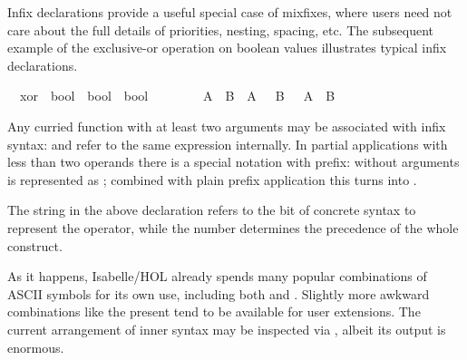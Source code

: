 \begin{isabellebody}
\begin{isamarkuptext}
  Infix declarations provide a useful
  special case of mixfixes, where users need not care about the full
  details of priorities, nesting, spacing, etc.  The subsequent
  example of the exclusive-or operation on boolean values illustrates
  typical infix declarations.%
\end{isamarkuptext}%
\isamarkuptrue%
\isanewline
\ \ xor\ {\isacharcolon}{\isacharcolon}\ {\isachardoublequote}bool\ {\isasymRightarrow}\ bool\ {\isasymRightarrow}\ bool{\isachardoublequote}\ \ \ \ {\isacharparenleft}\ {\isachardoublequote}{\isacharbrackleft}{\isacharplus}{\isacharbrackright}{\isachardoublequote}\ {}{}{\isacharparenright}\isanewline
\ \ {\isachardoublequote}A\ {\isacharbrackleft}{\isacharplus}{\isacharbrackright}\ B\ {\isasymequiv}\ {\isacharparenleft}A\ {\isasymand}\ {\isasymnot}\ B{\isacharparenright}\ {\isasymor}\ {\isacharparenleft}{\isasymnot}\ A\ {\isasymand}\ B{\isacharparenright}{\isachardoublequote}\isamarkupfalse%
%
\begin{isamarkuptext}%
Any curried function with at least two arguments may be associated
  with infix syntax:  and  refer to
  the same expression internally.  In partial applications with less
  than two operands there is a special notation with  prefix:
   without arguments is represented as ;
  combined with plain prefix application this turns 
  into .

  \medskip The string \isa{{\isachardoublequote}{\isacharbrackleft}{\isacharplus}{\isacharbrackright}{\isachardoublequote}} in the above declaration
  refers to the bit of concrete syntax to represent the operator,
  while the number  determines the precedence of the whole
  construct.

  As it happens, Isabelle/HOL already spends many popular combinations
  of ASCII symbols for its own use, including both \isa{{\isacharplus}} and
  \isa{{\isacharplus}{\isacharplus}}.  Slightly more awkward combinations like the present
  \isa{{\isacharbrackleft}{\isacharplus}{\isacharbrackright}} tend to be available for user extensions.  The current
  arrangement of inner syntax may be inspected via
  , albeit its output is enormous.


\end{isamarkuptext}
\end{isabellebody}
